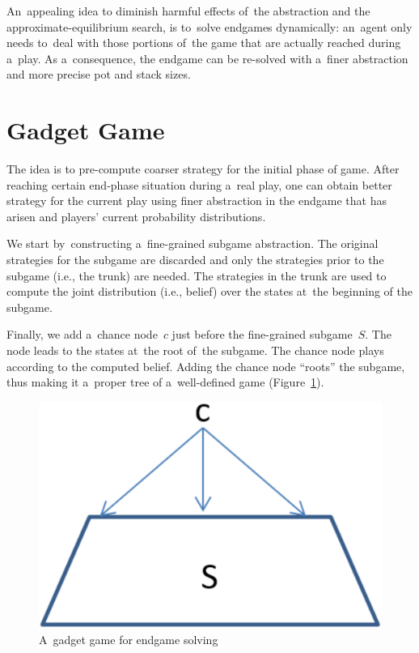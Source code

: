 An~appealing idea to diminish harmful effects of~the abstraction and the approximate-equilibrium search, is to~solve endgames dynamically:
an~agent only needs to~deal with those portions of~the game that are actually reached during a~play.
As a~consequence, the endgame can be re-solved with a~finer abstraction and more precise pot and stack sizes.

\section{Gadget Game}
The idea is to pre-compute coarser strategy for the initial phase of game.
After reaching certain end-phase situation during a~real play, one can obtain better strategy for the current play using finer abstraction in the endgame that has arisen and players' current probability distributions.

We start by~constructing a~fine-grained subgame abstraction.
The original strategies for the subgame are discarded and only the strategies prior to the subgame (i.e., the trunk) are needed.
The strategies in the trunk are used to compute the joint distribution (i.e., belief) over the states at~the beginning of the subgame.

Finally, we add a~chance node~$c$ just before the fine-grained subgame~$S$.
The node leads to the states at~the root of~the subgame.
The chance node plays according to the computed belief.
Adding the chance node ``roots'' the subgame, thus making it a~proper tree of a~well-defined game (Figure~\ref{fig:endgame-solving-gadget}).
\begin{figure}[H]
  \centering
  \includegraphics[width=.3\textwidth]{../img/endgame-solving-gadget.png}
  \caption{A~gadget game for endgame solving}
  \label{fig:endgame-solving-gadget}
\end{figure}

